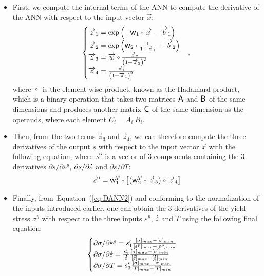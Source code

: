 \documentclass[algorithms,article,accept,pdftex,moreauthors]{Definitions/mdpi}
\DeclareRobustCommand{\w}{\mbox{\large\ensuremath{\mathsf{w}}}}
\DeclareRobustCommand{\A}{\mbox{\large\ensuremath{\mathsf{A}}}}
\DeclareRobustCommand{\B}{\mbox{\large\ensuremath{\mathsf{B}}}}
\DeclareRobustCommand{\C}{\mbox{\large\ensuremath{\mathsf{C}}}}
\DeclareRobustCommand{\dotp}{\boldsymbol{\cdot}}
\DeclareRobustCommand{\ccirc}{\kern0.5ex\vcenter{\hbox{$\scriptstyle\circ$}}\kern0.5ex}
\DeclareRobustCommand{\mdot}[1]{\accentset{\mbox{\bfseries .}}{#1}}
\begin{document}
\begin{itemize}
\item First, we compute the internal terms of the ANN to compute the derivative of the ANN with respect to the input vector $\overrightarrow{x}$:
\begin{equation}
\begin{cases}
\overrightarrow{z}_1 = \exp{\left(- \w_1 \dotp \overrightarrow{x}- \overrightarrow{b}_1\right)}\\
\overrightarrow{z}_2 = \exp{\left(\w_2 \dotp \frac{1}{1+\overrightarrow{z}_1} + \overrightarrow{b}_2\right)}\\
\overrightarrow{z}_3 = \overrightarrow{w} \ccirc \frac{ \overrightarrow{z}_2}{\left(1 + \overrightarrow{z}_2\right)^2}\\
\overrightarrow{z}_4 = \frac{\overrightarrow{z}_1}{\left(1+\overrightarrow{z}_1\right)^2}
\end{cases},
\label{eq:DANN1}
\end{equation}
where $\ccirc$ is the element-wise product, known as the Hadamard product, which is a binary operation that takes two matrices $\A$ and $\B$ of the same dimensions and produces another matrix $\C$ of the same dimension as the operands, where each element $C_i=A_i~B_i$.
\item Then, from~the two terms $\overrightarrow{z}_3$ and $\overrightarrow{z}_4$, we can therefore compute the three derivatives of the output $s$ with respect to the input vector $\overrightarrow{x}$ with the following equation, where $\overrightarrow{s}'$ is a vector of $3$ components containing the $3$ derivatives $\partial s/\partial\varepsilon^p$, $\partial s/\partial\mdot\varepsilon$ and $\partial s/\partial T$:
\begin{equation}
\overrightarrow{s}' = \w_1^T \dotp \left[\left(\w_2^T \dotp \overrightarrow{z}_3 \right) \ccirc \overrightarrow{z}_4\right]\label{eq:DANN2}
\end{equation}

\item Finally, from~Equation~(\ref{eq:DANN2}) and conforming to the normalization of the inputs introduced earlier, one can obtain the $3$ derivatives of the yield stress $\sigma^y$ with respect to the three inputs $\varepsilon^p$, $\mdot\varepsilon$ and $T$ using the following final equation:
\begin{equation}
\begin{cases}
\partial \sigma/\partial \varepsilon^p = s'_1 \frac{[\sigma]_{max} -[\sigma]_{min}}{[\varepsilon^p]_{max} -[\varepsilon^p]_{min}}\\
\partial \sigma/\partial\mdot\varepsilon = \frac{s'_2}{\mdot\varepsilon} \frac{[\sigma]_{max} -[\sigma]_{min}}{[\mdot\varepsilon]_{max} -[\mdot\varepsilon]_{min}} \\
\partial \sigma/\partial T = s'_3 \frac{[\sigma]_{max} -[\sigma]_{min}}{[T]_{max} -[T]_{min}}
\end{cases}
\label{eq:DANN3}
\end{equation}
\end{itemize}
\end{document}

